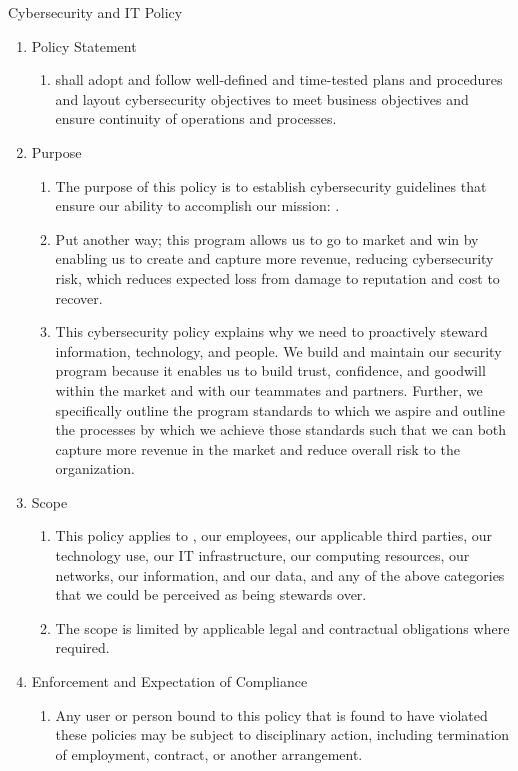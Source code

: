 \documentclass[../main.tex]{subfiles}
\begin{document}
Cybersecurity and IT Policy

\begin{enumerate}
  \item Policy Statement
  \begin{enumerate}
      \item{\CompanyName shall adopt and follow well-defined and time-tested plans and procedures and layout cybersecurity objectives to meet business objectives and ensure continuity of operations and processes.}
  \end{enumerate}
  \item Purpose
  \begin{enumerate}
    \item{The purpose of this policy is to establish cybersecurity guidelines that ensure our ability to accomplish our mission: \MissionStatement.}
    \item{Put another way; this program allows us to go to market and win by enabling us to create and capture more revenue, reducing cybersecurity risk, which reduces expected loss from damage to reputation and cost to recover.}
    \item{This cybersecurity policy explains why we need to proactively steward information, technology, and people. We build and maintain our security program because it enables us to build trust, confidence, and goodwill within the market and with our teammates and partners. Further, we specifically outline the program standards to which we aspire and outline the processes by which we achieve those standards such that we can both capture more revenue in the market and reduce overall risk to the organization.}
  \end{enumerate}
  \item Scope
  \begin{enumerate}
      \item This policy applies to \CompanyName, our employees, our applicable third parties, our technology use, our IT infrastructure, our computing resources, our networks, our information, and our data, and any of the above categories that we could be perceived as being stewards over.
      \item The scope is limited by applicable legal and contractual obligations where required.
  \end{enumerate}
  \item Enforcement and Expectation of Compliance
  \begin{enumerate}
      \item Any user or person bound to this policy that is found to have violated these policies may be subject to disciplinary action, including termination of employment, contract, or another arrangement.

\end{enumerate}
\end{enumerate}
\end{document}
